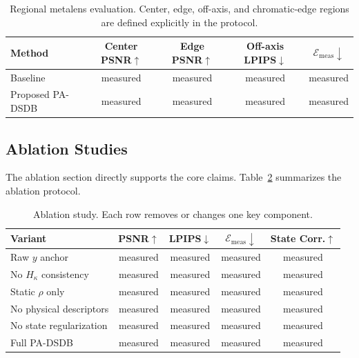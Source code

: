 \documentclass[journal]{IEEEtran}
\newcommand{\hk}{H_{\kappa}}
\begin{document}
\begin{table}[t]
\centering
\caption{Regional metalens evaluation. Center, edge, off-axis, and chromatic-edge regions are defined explicitly in the protocol.}
\label{tab:regional}
\begin{tabular}{lcccc}
\toprule
Method & Center PSNR$\uparrow$ & Edge PSNR$\uparrow$ & Off-axis LPIPS$\downarrow$ & $\mathcal{E}_{\mathrm{meas}}\downarrow$ \\
\midrule
Baseline & measured & measured & measured & measured \\
Proposed PA-DSDB & measured & measured & measured & measured \\
\bottomrule
\end{tabular}
\end{table}

\subsection{Ablation Studies}
The ablation section directly supports the core claims. Table~\ref{tab:ablation} summarizes the ablation protocol.

\begin{table}[t]
\centering
\caption{Ablation study. Each row removes or changes one key component.}
\label{tab:ablation}
\begin{tabular}{lcccc}
\toprule
Variant & PSNR$\uparrow$ & LPIPS$\downarrow$ & $\mathcal{E}_{\mathrm{meas}}\downarrow$ & State Corr.$\uparrow$ \\
\midrule
Raw $y$ anchor & measured & measured & measured & measured \\
No $\hk$ consistency & measured & measured & measured & measured \\
Static $\rho$ only & measured & measured & measured & measured \\
No physical descriptors & measured & measured & measured & measured \\
No state regularization & measured & measured & measured & measured \\
Full PA-DSDB & measured & measured & measured & measured \\
\bottomrule
\end{tabular}
\end{table}
\end{document}
